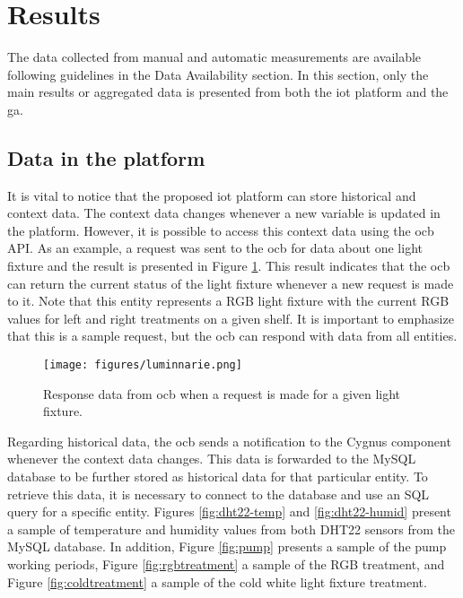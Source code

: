 \documentclass[preprint, review, 12pt]{elsarticle}
\begin{document}
\section{Results}

The data collected from manual and automatic measurements are available following guidelines in the Data Availability section. In this section, only the main results or aggregated data is presented from both the \gls{iot} platform and the \gls{ga}. 

\subsection{Data in the platform}

It is vital to notice that the proposed \gls{iot} platform can store historical and context data. The context data changes whenever a new variable is updated in the platform. However, it is possible to access this context data using the \gls{ocb} API. As an example, a request was sent to the \gls{ocb} for data about one light fixture and the result is presented in Figure \ref{fig:luminnarie}. This result indicates that the \gls{ocb} can return the current status of the light fixture whenever a new request is made to it. Note that this entity represents a RGB light fixture with the current RGB values for left and right treatments on a given shelf. It is important to emphasize that this is a sample request, but the \gls{ocb} can respond with data from all entities. 

\begin{figure}
    \centering
    \texttt{[image: figures/luminnarie.png]}
    \caption{Response data from \gls{ocb} when a request is made for a given light fixture.}
    \label{fig:luminnarie}
\end{figure}

Regarding historical data, the \gls{ocb} sends a notification to the Cygnus component whenever the context data changes. This data is forwarded to the MySQL database to be further stored as historical data for that particular entity. To retrieve this data, it is necessary to connect to the database and use an SQL query for a specific entity. Figures \ref{fig:dht22-temp} and \ref{fig:dht22-humid} present a sample of temperature and humidity values from both DHT22 sensors from the MySQL database. In addition, Figure \ref{fig:pump} presents a sample of the pump working periods, Figure \ref{fig:rgbtreatment} a sample of the RGB treatment, and Figure \ref{fig:coldtreatment} a sample of the cold white light fixture treatment.
\end{document}
